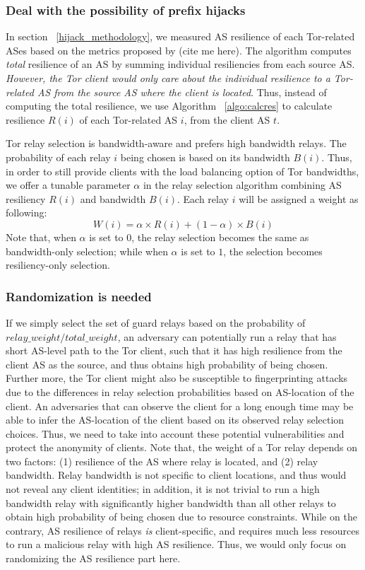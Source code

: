 \subsubsection{Deal with the possibility of prefix hijacks}

In section ~\ref{hijack_methodology}, we measured AS resilience of each Tor-related ASes based on the metrics proposed by (cite me here). The algorithm computes \emph{total} resilience of an AS by summing individual resiliencies from each source AS. \emph{However, the Tor client would only care about the individual resilience to a Tor-related AS from the source AS where the client is located}. Thus, instead of computing the total resilience, we use Algorithm ~\ref{algo:calcres} to calculate resilience $R(i)$ of each Tor-related AS $i$, from the client AS $t$. 

Tor relay selection is bandwidth-aware and prefers high bandwidth relays. The probability of each relay $i$ being chosen is based on its bandwidth $B(i)$. Thus, in order to still provide clients with the load balancing option of Tor bandwidths, we offer a tunable parameter $\alpha$ in the relay selection algorithm combining AS resiliency $R(i)$ and bandwidth $B(i)$. Each relay $i$ will be assigned a weight as following:
\begin{equation*}
W(i) = \alpha \times R(i) + (1 - \alpha) \times B(i)
\end{equation*}
Note that, when $\alpha$ is set to $0$, the relay selection becomes the same as bandwidth-only selection; while when $\alpha$ is set to $1$, the selection becomes resiliency-only selection. 

\subsubsection{Randomization is needed}

If we simply select the set of guard relays based on the probability of $relay\_weight/total\_weight$, an adversary can potentially run a relay that has short AS-level path to the Tor client, such that it has high resilience from the client AS as the source, and thus obtains high probability of being chosen. Further more, the Tor client might also be susceptible to fingerprinting attacks due to the differences in relay selection probabilities based on AS-location of the client. An adversaries that can observe the client for a long enough time may be able to infer the AS-location of the client based on its observed relay selection choices. Thus, we need to take into account these potential vulnerabilities and protect the anonymity of clients. Note that, the weight of a Tor relay depends on two factors: (1) resilience of the AS where relay is located, and (2) relay bandwidth. Relay bandwidth is not specific to client locations, and thus would not reveal any client identities; in addition, it is not trivial to run a high bandwidth relay with significantly higher bandwidth than all other relays to obtain high probability of being chosen due to resource constraints. While on the contrary, AS resilience of relays \emph{is} client-specific, and requires much less resources to run a malicious relay with high AS resilience. Thus, we would only focus on randomizing the AS resilience part here. 

